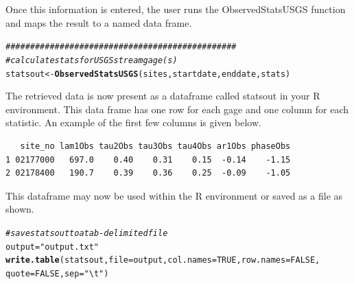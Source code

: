 \documentclass[a4paper,11pt]{article}\usepackage[]{graphicx}\usepackage[]{color}
\makeatletter
\newcommand{\hlnum}[1]{\textcolor[rgb]{0.686,0.059,0.569}{#1}}%
\newcommand{\hlstr}[1]{\textcolor[rgb]{0.192,0.494,0.8}{#1}}%
\newcommand{\hlcom}[1]{\textcolor[rgb]{0.678,0.584,0.686}{\textit{#1}}}%
\newcommand{\hlstd}[1]{\textcolor[rgb]{0.345,0.345,0.345}{#1}}%
\newcommand{\hlkwb}[1]{\textcolor[rgb]{0.69,0.353,0.396}{#1}}%
\newcommand{\hlkwc}[1]{\textcolor[rgb]{0.333,0.667,0.333}{#1}}%
\newcommand{\hlkwd}[1]{\textcolor[rgb]{0.737,0.353,0.396}{\textbf{#1}}}%
\newenvironment{kframe}{%
 \def\at@end@of@kframe{}%
 \ifinner\ifhmode%
  \def\at@end@of@kframe{\end{minipage}}%
  \begin{minipage}{\columnwidth}%
 \fi\fi%
 \def\FrameCommand##1{\hskip\@totalleftmargin \hskip-\fboxsep
 \colorbox{shadecolor}{##1}\hskip-\fboxsep
     \hskip-\linewidth \hskip-\@totalleftmargin \hskip\columnwidth}%
 \MakeFramed {\advance\hsize-\width
   \@totalleftmargin\z@ \linewidth\hsize
   \@setminipage}}%
 {\par\unskip\endMakeFramed%
 \at@end@of@kframe}
\newenvironment{knitrout}{}{} %
\makeatother
\begin{document}
Once this information is entered, the user runs the ObservedStatsUSGS function and maps the result to a named data frame.




\begin{knitrout}
\color{fgcolor}\begin{kframe}
\begin{alltt}
\hlcom{###############################################}
\hlcom{# calculate stats for USGS streamgage(s)}
\hlstd{statsout} \hlkwb{<-} \hlkwd{ObservedStatsUSGS}\hlstd{(sites,startdate,enddate,stats)}
\end{alltt}
\end{kframe}
\end{knitrout}


The retrieved data is now present as a dataframe called statsout in your R environment. This data frame has one row for each gage and one column for each statistic. An example of the first few columns is given below.

\begin{knitrout}
\color{fgcolor}\begin{kframe}
\begin{verbatim}
   site_no lam1Obs tau2Obs tau3Obs tau4Obs ar1Obs phaseObs
1 02177000   697.0    0.40    0.31    0.15  -0.14    -1.15
2 02178400   190.7    0.39    0.36    0.25  -0.09    -1.05
\end{verbatim}
\end{kframe}
\end{knitrout}


This dataframe may now be used within the R environment or saved as a file as shown.

\begin{knitrout}
\color{fgcolor}\begin{kframe}
\begin{alltt}
\hlcom{# save statsout to a tab-delimited file}
\hlstd{output} \hlkwb{=} \hlstr{"output.txt"}
\hlkwd{write.table}\hlstd{(statsout,} \hlkwc{file} \hlstd{= output,} \hlkwc{col.names} \hlstd{=} \hlnum{TRUE}\hlstd{,} \hlkwc{row.names} \hlstd{=} \hlnum{FALSE}\hlstd{,}
            \hlkwc{quote} \hlstd{=} \hlnum{FALSE}\hlstd{,} \hlkwc{sep} \hlstd{=} \hlstr{"\textbackslash{}t"}\hlstd{)}
\end{alltt}
\end{kframe}
\end{knitrout}
\end{document}
